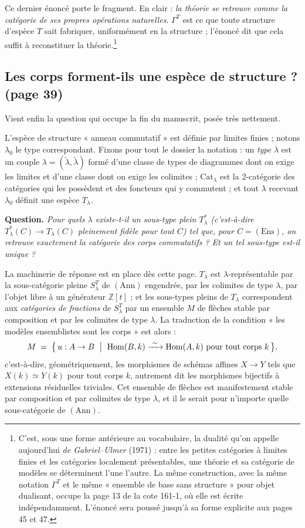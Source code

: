 \documentclass[11pt,a4paper]{article}
\begin{document}
Ce dernier énoncé porte le fragment. En clair :
\emph{la théorie se retrouve comme la catégorie de ses propres opérations
naturelles}. $\Gamma^{T}$ est ce que toute structure d'espèce $T$ sait
fabriquer, uniformément en la structure ; l'énoncé dit que cela suffit à
reconstituer la théorie.\footnote{C'est, sous une forme antérieure au
vocabulaire, la dualité qu'on appelle aujourd'hui \emph{de Gabriel--Ulmer}
(1971) : entre les petites catégories à limites finies et les catégories
localement présentables, une théorie et sa catégorie de modèles se déterminent
l'une l'autre. La même construction, avec la même notation $\Gamma^{T}$ et le
même « ensemble de base sans structure » pour objet dualisant, occupe la
page 13 de la cote 161-1, où elle est écrite indépendamment. L'énoncé
sera poussé jusqu'à sa forme explicite aux pages 45 et 47.}

\subsection*{Les corps forment-ils une espèce de structure ? (page 39)}

Vient enfin la question qui occupe la fin du manuscrit, posée très nettement.

L'espèce de structure « anneau commutatif » est définie par limites finies ;
notons $\lambda_{0}$ le type correspondant. Fixons pour tout le dossier la
notation : un \emph{type} $\lambda$ est un couple
$\lambda = (\underleftarrow{\lambda}, \underrightarrow{\lambda})$ formé d'une
classe de types de diagrammes dont on exige les limites et d'une classe dont on
exige les colimites ; $\mathrm{Cat}_{\lambda}$ est la 2-catégorie des
catégories qui les possèdent et des foncteurs qui y commutent ; et tout
$\lambda$ recevant $\lambda_{0}$ définit une espèce $T_{\lambda}$.

\textbf{Question.} \emph{Pour quels $\lambda$ existe-t-il un sous-type plein
$T^{*}_{\lambda}$ (c'est-à-dire $T^{*}_{\lambda}(C) \to T_{\lambda}(C)$
pleinement fidèle pour tout $C$) tel que, pour $C = (\mathrm{Ens})$, on
retrouve exactement la catégorie des corps commutatifs ? Et un tel sous-type
est-il unique ?}

La machinerie de réponse est en place dès cette page. $T_{\lambda}$ est
$\lambda$-représentable par la sous-catégorie pleine $S^{T}_{\lambda}$ de
$(\mathrm{Ann})$ engendrée, par les colimites de type $\lambda$, par l'objet
libre à un générateur $\mathbb{Z}[t]$ ; et les sous-types pleins de
$T_{\lambda}$ correspondent aux \emph{catégories de fractions} de
$S^{T}_{\lambda}$ par un ensemble $M$ de flèches stable par composition et par
les colimites de type $\lambda$. La traduction de la condition « les modèles
ensemblistes sont les corps » est alors :
\[
M \;=\; \bigl\{\, u : A \to B \ \bigm|\ \operatorname{Hom}(B,k)
\xrightarrow{\ \sim\ } \operatorname{Hom}(A,k) \ \text{pour tout corps } k
\,\bigr\},
\]
c'est-à-dire, géométriquement, les morphismes de schémas affines
$X \to Y$ tels que $X(k) \simeq Y(k)$ pour tout corps $k$, autrement dit les
morphismes bijectifs à extensions résiduelles triviales. Cet ensemble de flèches est
manifestement stable par composition et par colimites de type $\lambda$, et il
le serait pour n'importe quelle sous-catégorie de $(\mathrm{Ann})$.
\end{document}
